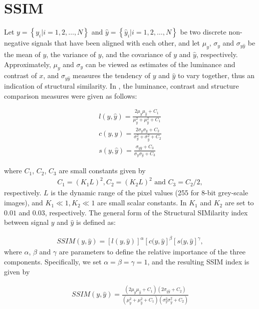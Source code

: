 \section{SSIM}
\label{sec:ssim}

Let $y = \left\{ y_i | i = 1, 2, \dots, N \right\}$ and $\hat{y} = \left\{ \hat{y}_i | i = 1, 2, \dots, N \right\}$ be two discrete non-negative signals that have been aligned with each other, and let $\mu_y$, $\sigma_y$ and $\sigma_{y\hat{y}}$ be the mean of $y$, the variance of $y$, and the covariance of $y$ and $\hat{y}$, respectively. Approximately, $\mu_y$ and $\sigma_y$ can be viewed as estimates of the luminance and contrast of $x$, and $\sigma_{y\hat{y}}$ measures the tendency of $y$ and $\hat{y}$ to vary together, thus an indication of structural similarity. In \cite{wang2004image}, the luminance, contrast and structure comparison measures were given as follows:

\begin{align}
l(y, \hat{y}) = \frac{2 \mu_y \mu_{\hat{y}} + C_1}{\mu^2_y + \mu^2_{\hat{y}} + C_1}\label{eq:luminance} \\
c(y, \hat{y}) = \frac{2\sigma_y\sigma_{\hat{y}} + C_2}{\sigma^2_y + \sigma^2_{\hat{y}} + C_2}\label{eq:constrast} \\
s(y, \hat{y}) = \frac{\sigma_{y\hat{y}} + C_3}{\sigma_y \sigma_{\hat{y}} + C_3}\label{eq:structure}
\end{align}

where $C_1$, $C_2$, $C_3$ are small constants given by
\begin{align}
C_1 = \left( K_1 L \right)^2, C_2 = \left( K_2 L \right)^2 \text{ and } C_3 = C_2 / 2,
\end{align}
respectively. $L$ is the dynamic range of the pixel values (255 for 8-bit grey-scale images), and $K_1 \ll 1, K_2 \ll 1$ are small scalar constants. In \cite{wang2004image} $K_1$ and $K_2$ are set to $0.01$ and $0.03$, respectively. The general form of the Structural SIMilarity index between signal $y$ and $\hat{y}$ is defined as:

\begin{align}
SSIM(y, \hat{y}) = [l(y, \hat{y})]^{\alpha} [c(y, \hat{y}]^{\beta} [s(y, \hat{y}]^{\gamma},
\end{align}
where $\alpha$, $\beta$ and $\gamma$ are parameters to define the relative importance of the three components. Specifically, we set $\alpha = \beta = \gamma = 1$, and the resulting SSIM index is given by

\begin{align}
SSIM(y, \hat{y}) = \frac{
    \left( 2 \mu_{y} \mu_{\hat{y}} + C_1 \right) \left( 2 \sigma_{y \hat{y}} + C_2 \right)
}{
    \left( \mu_{y}^2 + \mu_{\hat{y}}^2 + C_1 \right) \left( \sigma_{y}^2 \sigma_{\hat{y}}^2 + C_2 \right)
}
\end{align}

